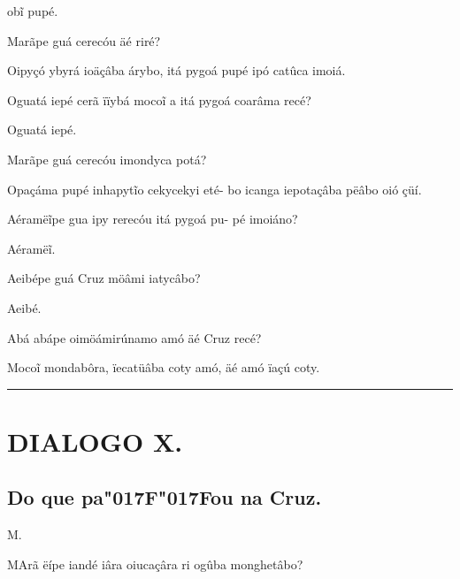 \documentclass[openany,titlepage,12pt]{book}
\renewcommand{\chaptermark}[1]{\markboth{#1}{}}
\renewcommand{\sectionmark}[1]{\gdef\rightmark{#1}}
\newcommand{\lgSS}{\char"017F\char"017F}
\newcommand{\comecalista}[5]{
    \hspace*{-11.7pt}
    \begin{minipage}[t]{0.08\linewidth}
        \flushright #1\\#2
    \end{minipage}
    \hspace{0pt}
    \begin{minipage}[t]{0.94\linewidth}
        \lettrine
        [findent =2pt, nindent=0pt,  lines=2]
        {#3}{#4}#5
    \end{minipage}
    \vspace*{-3pt}
}
\begin{document}
\begin{altereven}
        ob\~i pupé.
    \item Marãpe guá cerecóu äé riré?
    \item Oipyçó ybyrá ioäçâba árybo, itá pygoá
        pupé ipó catûca imoiá.
    \item Oguatá iepé cerã ïïybá moco\~i a itá pygoá
        coarâma recé?
    \item Oguatá iepé.
    \item Marãpe guá cerecóu imondyca potá?
    \pagebreak
    \item Opaçáma pupé inhapyt\~io cekycekyi eté-
        bo icanga iepotaçâba pëâbo oió çüí.
    \item Aéramë\~ipe gua ipy rerecóu itá pygoá pu-
        pé imoiáno?
    \item Aéramë\~i.
    \item Aeibépe guá Cruz möâmi iatycâbo?
    \item Aeibé.
    \item Abá abápe oimöámirúnamo amó äé Cruz
        recé?
    \item Moco\~i mondabôra, ïecatüâba coty amó,
        äé amó ïaçú coty.
\end{altereven}

\vspace{2pt}
\par\noindent\rule{\textwidth}{0.4pt}
\unskip\vspace*{2pt}
\section{DIALOGO X.}
\unskip\vspace{2pt}
\subsection{Do que pa\lgSS ou na Cruz.}

\chaptermark{Dialogo X.}
\sectionmark{Do que pa\lgSS ou na Cruz.}
\vspace*{2pt}

\comecalista{M.}{}{M}{A}
{rã ëípe iandé iâra oiucaçâra ri\linebreak
    \hspace*{2ex}ogûba monghetâbo?
}
\end{document}
